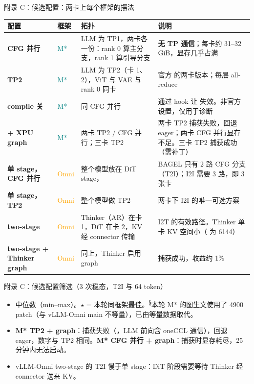 \begin{frame}[t]{附录 C：候选配置：两卡上每个框架的摆法}
\scriptsize\def\codesize{\relax}
\renewcommand{\arraystretch}{1.12}\setlength{\tabcolsep}{3pt}
\begin{tabularx}{\textwidth}{>{\bfseries}p{3.4cm} p{1.0cm} p{3.9cm} Y}
\toprule
{}
配置 & 框架 & 拓扑 & 说明 \\
\midrule
CFG 并行 & \textcolor{Teal}{M*} & LLM 为 TP1，两卡各一份：rank 0 算主分支，rank 1 算引导分支 & \textbf{无 TP 通信}；每卡约 31--32 GiB，显存几乎占满 \\
TP2 & \textcolor{Teal}{M*} & LLM 为 TP2（卡 1、2），ViT 与 VAE 与 rank 0 同卡 & 官方  的两卡版本；每层 all-reduce \\
compile 关 & \textcolor{Teal}{M*} & 同 CFG 并行 & 通过 hook 让  失效。非官方设置，仅用于诊断 \\
+ XPU graph & \textcolor{Teal}{M*} & 两卡 TP2 / CFG 并行；三卡 TP2 & 两卡 TP2 捕获失败，回退 eager；两卡 CFG 并行显存不足。三卡 TP2 捕获成功（需补丁） \\
\midrule
单 stage，CFG 并行 & \textcolor{Orange}{Omni} & 整个模型放在 DiT stage， & BAGEL 只有 2 路 CFG 分支（T2I）；I2I 需要 3 路，即 3 张卡 \\
单 stage，TP2 & \textcolor{Orange}{Omni} & 整个模型做 TP2 & 两卡下 I2I 的唯一可选方案 \\
two-stage & \textcolor{Orange}{Omni} & Thinker（AR）在卡 1，DiT 在卡 2，KV 经 connector 传输 & I2T 的有效路径。Thinker 单卡 KV 空间小（ 为 6144） \\
two-stage + Thinker graph & \textcolor{Orange}{Omni} & 同上，Thinker 启用 graph & 捕获成功，收益约 1\% \\
\bottomrule
\end{tabularx}
\end{frame}

\begin{frame}[t]{附录 C：候选配置筛选（3 次稳态，T2I 与 64 token）}
\scriptsize\def\codesize{\relax}
\renewcommand{\arraystretch}{1.12}\setlength{\tabcolsep}{3pt}

\vspace{4pt}
\begin{itemize}\scriptsize\setlength\itemsep{1pt}
  \item 中位数（min--max）。$\star$ = 本轮同框架最佳。\textsuperscript{§}本轮 M* 的图生文使用了 4900 patch（与 vLLM-Omni main 不等量），已由等量数据取代。
  \item \textbf{M* TP2 + graph}：捕获失败（，LLM 前向含 oneCCL 通信），回退 eager，数字与 TP2 相同。\textbf{M* CFG 并行 + graph}：捕获时显存耗尽，25 分钟内无法启动。
  \item vLLM-Omni two-stage 的 T2I 慢于单 stage：DiT 阶段需要等待 Thinker 经 connector 送来 KV。
\end{itemize}
\end{frame}

